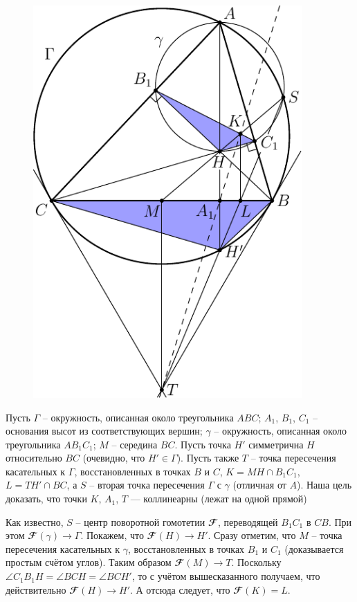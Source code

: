 \documentclass[14pt]{extarticle}
\newcommand{\F}{\mathbfcal{F}}
\begin{document}
\begin{figure}[H]
    \centering
    \includegraphics[height=15cm]{fig.pdf}
\end{figure}


Пусть \(\Gamma\) -- окружность, описанная около треугольника \(ABC\); 
\(A_1\), \(B_1\), \(C_1\) -- основания высот из соответствующих вершин; 
\(\gamma\) -- окружность, описанная около треугольника \(AB_1C_1\);
\(M\) -- середина \(BC\). Пусть точка \(H'\) симметрична \(H\) относительно 
\(BC\) (очевидно, что \(H' \in \Gamma\)). Пусть также \(T\) -- точка 
пересечения касательных к \(\Gamma\), восстановленных в точках \(B\) и 
\(C\), \(K = MH \cap B_1C_1\), \(L = TH' \cap BC\), а \(S\) 
-- вторая точка пересечения \(\Gamma\) с \(\gamma\) 
(отличная от \(A\)). Наша цель доказать, что 
точки \(K\), \(A_1\), \(T\) --- коллинеарны (лежат на одной прямой)

Как известно, \(S\) -- центр поворотной гомотетии \(\F\), переводящей 
\(B_1C_1\) в \(CB\). При этом \(\F(\gamma) \rightarrow \Gamma\). 
Покажем, что \(\F(H) \rightarrow H'\). 
Сразу отметим, что \(M\) -- точка пересечения касательных к \(\gamma\), 
восстановленных в точках \(B_1\) и \(C_1\) (доказывается простым счётом 
углов). Таким образом \(\F(M) \rightarrow T\). Поскольку 
\(\angle C_1B_1H = \angle BCH = \angle BCH'\), то с учётом 
вышесказанного получаем, что действительно \(\F(H) 
\rightarrow H'\). А отсюда следует, что \(\F(K) = L\).
\end{document}
